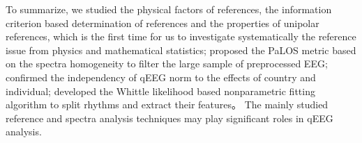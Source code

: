 \begin{englishabstract}
To summarize, we studied the physical factors of references, the information criterion based determination of references and the properties of unipolar references, which is the first time for us to investigate systematically the reference issue from physics and mathematical statistics; proposed the PaLOS metric based on the spectra homogeneity to filter the large sample of preprocessed EEG; confirmed the independency of qEEG norm to the effects of country and individual; developed the Whittle likelihood based nonparametric fitting algorithm to split rhythms and extract their features。 The mainly studied reference and spectra analysis techniques may play significant roles in qEEG analysis.

\end{englishabstract}


